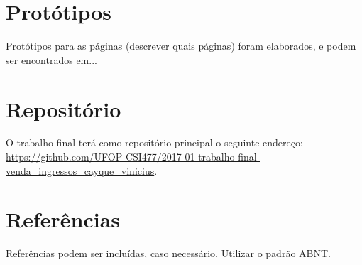 \documentclass[10pt,a4paper,article]{abntex2}
\begin{document}
	\section{Protótipos}
		  Protótipos para as páginas (descrever quais páginas) foram elaborados, e podem ser encontrados em...

	\section{Repositório}

		O trabalho final terá como repositório principal o seguinte endereço: \url{https://github.com/UFOP-CSI477/2017-01-trabalho-final-venda_ingressos_cayque_vinicius}.

	\section{Referências}
	Referências podem ser incluídas, caso necessário. Utilizar o padrão ABNT.
\end{document}
